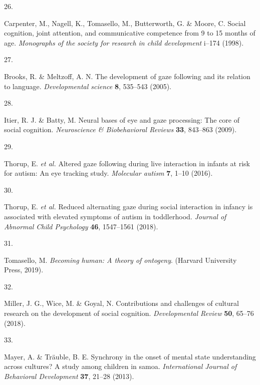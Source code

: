 \documentclass[
  man,floatsintext]{apa6}
\newlength{\cslhangindent}
\newlength{\csllabelwidth}
\newlength{\cslentryspacingunit} %
\newenvironment{CSLReferences}[2] %
 {%
  \setlength{\parindent}{0pt}
  \ifodd #1
  \let\oldpar\par
  \def\par{\hangindent=\cslhangindent\oldpar}
  \fi
  \setlength{\parskip}{#2\cslentryspacingunit}
 }%
 {}
\newcommand{\CSLLeftMargin}[1]{\parbox[t]{\csllabelwidth}{#1}}
\newcommand{\CSLRightInline}[1]{\parbox[t]{\linewidth - \csllabelwidth}{#1}\break}
\begin{document}
\begin{CSLReferences}{0}{0}
\leavevmode{}%
\CSLLeftMargin{26. }%
\CSLRightInline{Carpenter, M., Nagell, K., Tomasello, M., Butterworth, G. \& Moore, C. Social cognition, joint attention, and communicative competence from 9 to 15 months of age. \emph{Monographs of the society for research in child development} i--174 (1998).}

\leavevmode{}%
\CSLLeftMargin{27. }%
\CSLRightInline{Brooks, R. \& Meltzoff, A. N. The development of gaze following and its relation to language. \emph{Developmental science} \textbf{8}, 535--543 (2005).}

\leavevmode{}%
\CSLLeftMargin{28. }%
\CSLRightInline{Itier, R. J. \& Batty, M. Neural bases of eye and gaze processing: The core of social cognition. \emph{Neuroscience \& Biobehavioral Reviews} \textbf{33}, 843--863 (2009).}

\leavevmode{}%
\CSLLeftMargin{29. }%
\CSLRightInline{Thorup, E. \emph{et al.} Altered gaze following during live interaction in infants at risk for autism: An eye tracking study. \emph{Molecular autism} \textbf{7}, 1--10 (2016).}

\leavevmode{}%
\CSLLeftMargin{30. }%
\CSLRightInline{Thorup, E. \emph{et al.} Reduced alternating gaze during social interaction in infancy is associated with elevated symptoms of autism in toddlerhood. \emph{Journal of Abnormal Child Psychology} \textbf{46}, 1547--1561 (2018).}

\leavevmode{}%
\CSLLeftMargin{31. }%
\CSLRightInline{Tomasello, M. \emph{Becoming human: A theory of ontogeny}. (Harvard University Press, 2019).}

\leavevmode{}%
\CSLLeftMargin{32. }%
\CSLRightInline{Miller, J. G., Wice, M. \& Goyal, N. Contributions and challenges of cultural research on the development of social cognition. \emph{Developmental Review} \textbf{50}, 65--76 (2018).}

\leavevmode{}%
\CSLLeftMargin{33. }%
\CSLRightInline{Mayer, A. \& Träuble, B. E. Synchrony in the onset of mental state understanding across cultures? A study among children in samoa. \emph{International Journal of Behavioral Development} \textbf{37}, 21--28 (2013).}


\end{CSLReferences}
\end{document}
